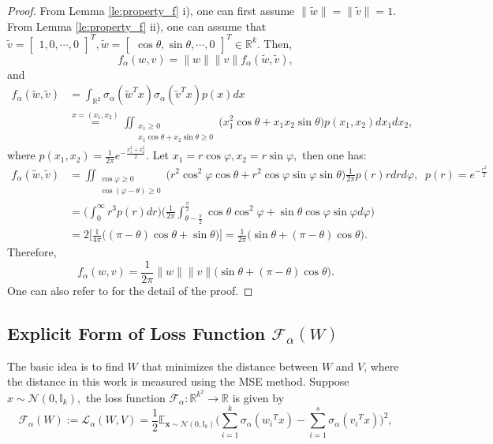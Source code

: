 \documentclass{amsart}%
\begin{document}
\begin{proof}
   From Lemma \eqref{le:property_f} i), one can first assume $\|\tilde{w}\|=\|\tilde{ v}\|=1.$ From Lemma \eqref{le:property_f} ii), one can assume that $\tilde{ v}={\begin{bmatrix}
       1,0,\cdots,0
   \end{bmatrix}}^T, \tilde{ w}={\begin{bmatrix}
       \cos \theta,\sin \theta,\cdots,0
   \end{bmatrix}}^T \in \mathbb{R}^k.$ Then,
   \[
   f_{\alpha}( w, v)=\| w\|\| v\|f_{\alpha}(\tilde{ w},\tilde{ v}),
   \]
and 
\begin{align*}
f_{\alpha}(\tilde{ w},\tilde{ v})
&= \int_{\mathbb{R}^2}\sigma_{\alpha}({\tilde{ w}^T x})\sigma_{\alpha}({\tilde{ v}^T x})p( x)d x\\
&\overset{ x=(x_1,x_2)}{=}\iint_{\substack{x_1\geq 0\\ x_1 \cos \theta+x_2\sin \theta\geq 0}}\Big(x_1^2\cos\theta+x_1x_2\sin\theta\Big)p(x_1,x_2)dx_1dx_2,
\end{align*}
where $p(x_1,x_2)=\frac{1}{2\pi}e^{-\frac{x_1^2+x_2^2}{2}}.$\vskip0.3cm
Let $x_1=r\cos\varphi, x_2=r\sin\varphi,$ then one has:
\begin{align*}
f_{\alpha}(\tilde{ w},\tilde{ v})
&= \iint_{\substack{\cos \varphi\geq 0\\ \cos(\varphi-\theta)\geq 0}}\Big(r^2\cos^2\varphi\cos\theta+r^2\cos\varphi\sin\varphi\sin\theta\Big)\frac{1}{2\pi}p(r)rdrd\varphi,\;\; p(r)=e^{-\frac{r^2}{2}}\\
&=\Big(\int_0^\infty r^3p(r)dr\Big)\Big(\frac{1}{2\pi}\int_{\theta-\frac{\pi}{2}}^\frac{\pi}{2} \cos\theta \cos^2\varphi+\sin \theta\cos\varphi\sin\varphi d\varphi\Big)\\
&=2\Bigg[\frac{1}{4\pi}\Big((\pi-\theta)\cos\theta+\sin\theta\Big)\Bigg]
=\frac{1}{2\pi}\Big(\sin\theta+(\pi-\theta)\cos\theta\Big).\end{align*}
Therefore,
\[
f_{\alpha}( w,v)=\frac{1}{2\pi}\|w\|\| v\|\Big(\sin\theta+(\pi-\theta)\cos\theta\Big).
\]
One can also refer to \cite{arjevani2021analytic} for the detail of the proof.
\end{proof}
\subsection{Explicit Form of Loss Function \texorpdfstring{$\mathcal F_{\alpha}(W)$}{Fα(W)}}\label{app:explicit_form}
The basic idea is to find $
W$ that minimizes the distance between $W$ and
$V$, where the distance in this work is measured using the MSE method. Suppose $x\sim \mathcal{N}(0,\mathbb I_k),$ the loss function $\mathcal{F}_{\alpha}:\mathbb R^{k^2}\to \mathbb{R}$ is given by \begin{equation*}
    \mathcal{F}_{\alpha}(W):=\mathcal{L}_{\alpha}(W,V)=\frac{1}{2}\mathbb{E}_{\mathbf x\sim \mathcal{N}(0,\mathbb I_k)}\Big(\sum_{i=1 }^{k}\sigma_{\alpha}({w_i}^T x)-\sum_{i=1}^{s}\sigma_{\alpha}({v_i}^T{x}) \Big)^2,
\end{equation*}
\end{document}
